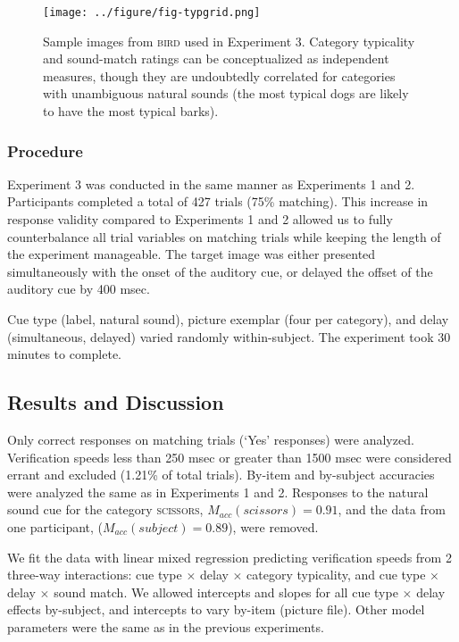 \documentclass[12pt, titlepage]{article}
\begin{document}
\begin{figure}[h!]
	\centering
	\caption{Sample images from \textsc{bird} used in Experiment 3. Category typicality and sound-match ratings can be conceptualized as independent measures, though they are undoubtedly correlated for categories with unambiguous natural sounds (the most typical dogs are likely to have the most typical barks).}
	\label{fig:quad}
	\texttt{[image: ../figure/fig-typgrid.png]}
\end{figure}

\subsubsection*{Procedure}
Experiment 3 was conducted in the same manner as Experiments 1 and 2. Participants completed a total of 427 trials (75\% matching). This increase in response validity compared to Experiments 1 and 2 allowed us to fully counterbalance all trial variables on matching trials while keeping the length of the experiment manageable. The target image was either presented simultaneously with the onset of the auditory cue, or delayed the offset of the auditory cue by 400 msec.

Cue type (label, natural sound), picture exemplar (four per category), and delay (simultaneous, delayed) varied randomly within-subject. The experiment took 30 minutes to complete.

\subsection{Results and Discussion}
Only correct responses on matching trials (`Yes' responses) were analyzed. Verification speeds less than 250 msec or greater than 1500 msec were considered errant and excluded (1.21\% of total trials). By-item and by-subject accuracies were analyzed the same as in Experiments 1 and 2. Responses to the natural sound cue for the category \textsc{scissors}, $M_{acc}(scissors)=0.91$, and the data from one participant, ($M_{acc}(subject)=0.89$), were removed.

We fit the data with linear mixed regression predicting verification speeds from 2 three-way interactions: cue type $\times$ delay $\times$ category typicality, and cue type $\times$ delay $\times$ sound match. We allowed intercepts and slopes for all cue type $\times$ delay effects by-subject, and intercepts to vary by-item (picture file). Other model parameters were the same as in the previous experiments.
\end{document}
